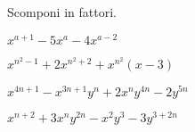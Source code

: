 
\begin{esercizio}[*]
\label{ese:17.45}
Scomponi in fattori.
\begin{enumeratea}
\item \(x^{a+1}-5x^{a}-4x^{a-2}\)
\item \(x^{n^{2}-1}+2x^{n^{2}+2}+x^{n^{2}}(x-3)\)
\item \(x^{4n+1}-x^{3n+1}y^{n}+2x^{n}y^{4n}-2y^{5n}\)
\item \(x^{n+2}+3x^{n}y^{2n}-x^{2}y^{3}-3y^{3+2n}\)
\end{enumeratea}
\end{esercizio}

